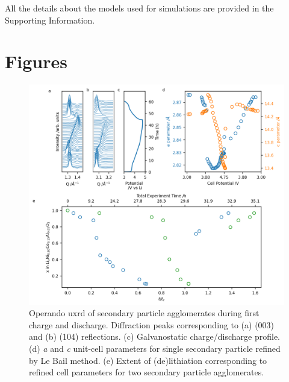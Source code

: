 \documentclass{article}
\begin{document}
All the details about the models used for simulations are provided in the Supporting Information. 



\newpage
\section*{Figures}

\begin{figure}[!h]
  \includegraphics{figures/NCA_xrd.png}
  \caption{Operando \gls{uxrd} of \nca{} secondary particle
    agglomerates during first charge and discharge. Diffraction peaks
    corresponding to (a) (003) and (b) (104) reflections. (c)
    Galvanostatic charge/discharge profile. (d) \textit{a} and
    \textit{c} unit-cell parameters for single secondary particle
    refined by Le Bail method. (e) Extent of (de)lithiation
    corresponding to refined cell parameters\cite{robert2015} for two
    secondary particle agglomerates.}
  \label{fig:uxrd}
\end{figure}
\end{document}
